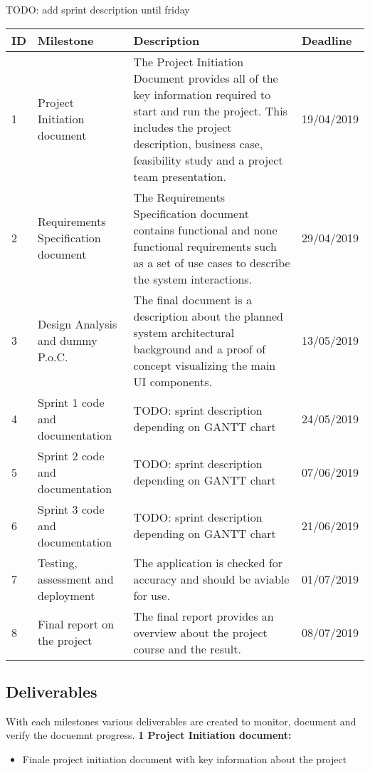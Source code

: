 \documentclass[notitlepage]{article}
\begin{document}
\begin{flushleft}
{\color{red} TODO: add sprint description until friday} \\
\begin{center}
  \begin{tabular}{ m{0.4cm} m{5cm} m{8.5cm} m{2cm} }
  	\hline
		ID & Milestone & Description & Deadline \\ \hline
		1 & Project Initiation document & The Project Initiation Document provides all of the key information required to start and run the project. This includes the project description, business case, feasibility study and a project team presentation.  & 19/04/2019 \\ \hline
		2 & Requirements Specification document & The Requirements Specification document contains functional and none functional requirements such as a set of use cases to describe the system interactions. & 29/04/2019 \\ \hline
		3 & Design Analysis and dummy P.o.C. & The final document is a description about the planned system architectural background and a proof of concept visualizing the main UI components. & 13/05/2019 \\ \hline
		4 & Sprint 1 code and documentation & {\color{red} TODO: sprint description depending on GANTT chart}  & 24/05/2019 \\ \hline
		5 & Sprint 2 code and documentation & {\color{red} TODO: sprint description depending on GANTT chart} & 07/06/2019 \\ \hline
		6 & Sprint 3 code and documentation & {\color{red} TODO: sprint description depending on GANTT chart} & 21/06/2019 \\ \hline
		7 & Testing, assessment and deployment & The application is checked for accuracy and should be aviable for use. & 01/07/2019 \\ \hline
		8 & Final report on the project & The final report provides an overview about the project course and the result. & 08/07/2019 \\ \hline
	\end{tabular}
\end{center}

 

\subsection{Deliverables}
With each milestones various deliverables are created to monitor, document and verify the docuemnt progress.
\newline
\textbf{1 Project Initiation document:}
\\
\begin{itemize}
	\item Finale project initiation document with key information about the project
\end{itemize}


\end{flushleft}
\end{document}
